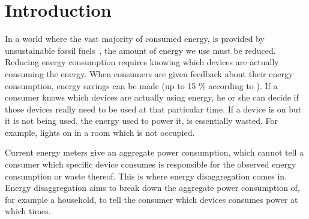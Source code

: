 
\chapter{Introduction}
\label{chp:introduction}

\vspace{1\baselineskip}

\noindent


In a world where the vast majority of consumed energy, is provided by unsustainable fossil fuels~\cite{kolter2011redd}, the amount of energy we use must be reduced.
Reducing energy consumption requires knowing which devices are actually consuming the energy.
When consumers are given feedback about their energy consumption, energy savings can be made (up to 15 \% according to \cite{darby2006effectiveness}).
If a consumer knows which devices are actually using energy, he or she can decide if those devices really need to be used at that particular time.
If a device is on but it is not being used, the energy used to power it, is essentially wasted.
For example, lights on in a room which is not occupied.



Current energy meters give an aggregate power consumption, which cannot tell a consumer which specific device consumes is responsible for the observed energy consumption or waste thereof.
This is where energy disaggregation comes in.
Energy disaggregation aims to break down the aggregate power consumption of, for example a household, to tell the consumer which devices consumes power at which times.




